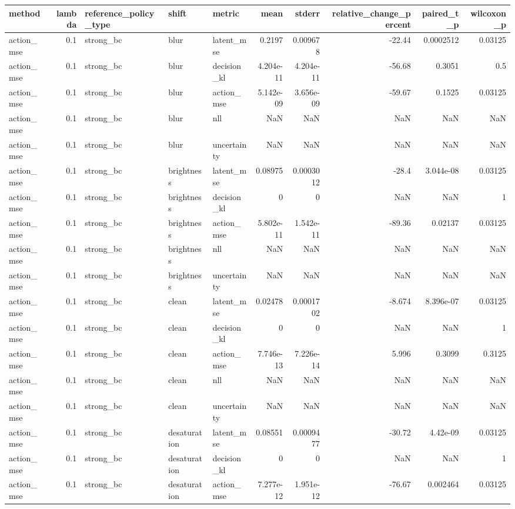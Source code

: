 \begin{tabular}{lrlllrrrrr}
\toprule
method & lambda & reference\_policy\_type & shift & metric & mean & stderr & relative\_change\_percent & paired\_t\_p & wilcoxon\_p \\
\midrule
action\_mse & 0.1 & strong\_bc & blur & latent\_mse & 0.2197 & 0.009678 & -22.44 & 0.0002512 & 0.03125 \\
action\_mse & 0.1 & strong\_bc & blur & decision\_kl & 4.204e-11 & 4.204e-11 & -56.68 & 0.3051 & 0.5 \\
action\_mse & 0.1 & strong\_bc & blur & action\_mse & 5.142e-09 & 3.656e-09 & -59.67 & 0.1525 & 0.03125 \\
action\_mse & 0.1 & strong\_bc & blur & nll & NaN & NaN & NaN & NaN & NaN \\
action\_mse & 0.1 & strong\_bc & blur & uncertainty & NaN & NaN & NaN & NaN & NaN \\
action\_mse & 0.1 & strong\_bc & brightness & latent\_mse & 0.08975 & 0.0003012 & -28.4 & 3.044e-08 & 0.03125 \\
action\_mse & 0.1 & strong\_bc & brightness & decision\_kl & 0 & 0 & NaN & NaN & 1 \\
action\_mse & 0.1 & strong\_bc & brightness & action\_mse & 5.802e-11 & 1.542e-11 & -89.36 & 0.02137 & 0.03125 \\
action\_mse & 0.1 & strong\_bc & brightness & nll & NaN & NaN & NaN & NaN & NaN \\
action\_mse & 0.1 & strong\_bc & brightness & uncertainty & NaN & NaN & NaN & NaN & NaN \\
action\_mse & 0.1 & strong\_bc & clean & latent\_mse & 0.02478 & 0.0001702 & -8.674 & 8.396e-07 & 0.03125 \\
action\_mse & 0.1 & strong\_bc & clean & decision\_kl & 0 & 0 & NaN & NaN & 1 \\
action\_mse & 0.1 & strong\_bc & clean & action\_mse & 7.746e-13 & 7.226e-14 & 5.996 & 0.3099 & 0.3125 \\
action\_mse & 0.1 & strong\_bc & clean & nll & NaN & NaN & NaN & NaN & NaN \\
action\_mse & 0.1 & strong\_bc & clean & uncertainty & NaN & NaN & NaN & NaN & NaN \\
action\_mse & 0.1 & strong\_bc & desaturation & latent\_mse & 0.08551 & 0.0009477 & -30.72 & 4.42e-09 & 0.03125 \\
action\_mse & 0.1 & strong\_bc & desaturation & decision\_kl & 0 & 0 & NaN & NaN & 1 \\
action\_mse & 0.1 & strong\_bc & desaturation & action\_mse & 7.277e-12 & 1.951e-12 & -76.67 & 0.002464 & 0.03125 \\

\end{tabular}
